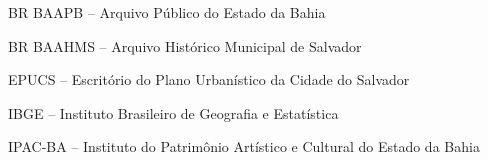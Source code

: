 \begin{siglas}
\item BR BAAPB -- Arquivo Público do Estado da Bahia
\item BR BAAHMS -- Arquivo Histórico Municipal de Salvador
\item EPUCS -- Escritório do Plano Urbanístico da Cidade do Salvador
\item IBGE -- Instituto Brasileiro de Geografia e Estatística
\item IPAC-BA -- Instituto do Patrimônio Artístico e Cultural do Estado da Bahia
\end{siglas}